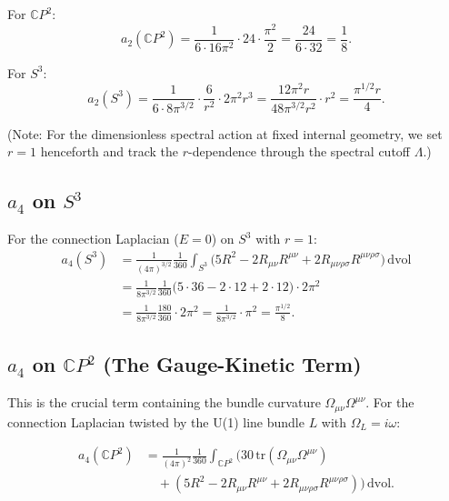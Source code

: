 \documentclass[12pt,a4paper]{article}
\begin{document}
For $\mathbb{C}P^2$:
\begin{equation}\label{eq:a2-CP2}
a_2(\mathbb{C}P^2) = \frac{1}{6 \cdot 16\pi^2}
\cdot 24 \cdot \frac{\pi^2}{2}
= \frac{24}{6 \cdot 32} = \frac{1}{8}.
\end{equation}

For $S^3$:
\begin{equation}\label{eq:a2-S3}
a_2(S^3) = \frac{1}{6 \cdot 8\pi^{3/2}}
\cdot \frac{6}{r^2} \cdot 2\pi^2 r^3
= \frac{12\pi^2 r}{48\pi^{3/2} r^2}
\cdot r^2
= \frac{\pi^{1/2} r}{4}.
\end{equation}

(Note: For the dimensionless spectral action at fixed internal geometry, we
set $r = 1$ henceforth and track the $r$-dependence through the spectral
cutoff $\Lambda$.)

\subsection{$a_4$ on $S^3$}

For the connection Laplacian ($E = 0$) on $S^3$ with $r = 1$:
\begin{align}
a_4(S^3) &= \frac{1}{(4\pi)^{3/2}} \frac{1}{360}
\int_{S^3} \Big(5R^2 - 2R_{\mu\nu}R^{\mu\nu}
+ 2R_{\mu\nu\rho\sigma}R^{\mu\nu\rho\sigma}\Big)\,\mathrm{dvol} \nonumber\\
&= \frac{1}{8\pi^{3/2}} \frac{1}{360}
\Big(5 \cdot 36 - 2 \cdot 12 + 2 \cdot 12\Big) \cdot 2\pi^2 \nonumber\\
&= \frac{1}{8\pi^{3/2}} \frac{180}{360} \cdot 2\pi^2
= \frac{1}{8\pi^{3/2}} \cdot \pi^2
= \frac{\pi^{1/2}}{8}. \label{eq:a4-S3}
\end{align}

\subsection{$a_4$ on $\mathbb{C}P^2$ (The Gauge-Kinetic Term)}

This is the crucial term containing the bundle curvature
$\Omega_{\mu\nu}\Omega^{\mu\nu}$.  For the connection Laplacian twisted
by the U(1) line bundle $L$ with $\Omega_L = i\omega$:

\begin{align}
a_4(\mathbb{C}P^2) &= \frac{1}{(4\pi)^2} \frac{1}{360}
\int_{\mathbb{C}P^2} \bigg(
30\,\mathrm{tr}(\Omega_{\mu\nu}\Omega^{\mu\nu}) \nonumber\\
&\quad + (5R^2 - 2R_{\mu\nu}R^{\mu\nu}
+ 2R_{\mu\nu\rho\sigma}R^{\mu\nu\rho\sigma})\bigg)\,\mathrm{dvol}.
\label{eq:a4-CP2-start}
\end{align}
\end{document}
